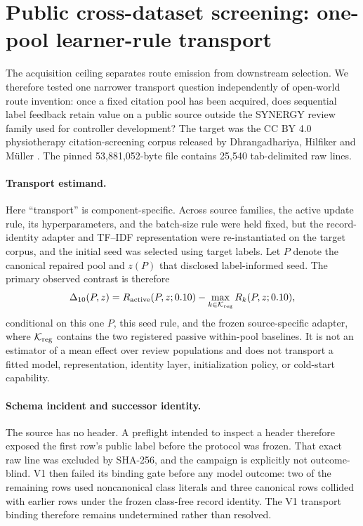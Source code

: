 \section{Public cross-dataset screening: one-pool learner-rule transport}
\label{sec:public-screening-transport}

The acquisition ceiling separates route emission from downstream selection.
We therefore tested one narrower transport question independently of open-world
route invention: once a fixed citation pool has been acquired, does sequential
label feedback retain value on a public source outside the SYNERGY review
family used for controller development?  The target was the CC BY 4.0
physiotherapy citation-screening corpus released by Dhrangadhariya, Hilfiker and
M\"uller \cite{dhrangadhariya2023citationdataset}.  The pinned 53,881,052-byte
file contains 25,540 tab-delimited raw lines.

\paragraph{Transport estimand.}
Here ``transport'' is component-specific. Across source families, the active
update rule, its hyperparameters, and the batch-size rule were held fixed, but the record-identity
adapter and TF--IDF representation were re-instantiated on the target corpus,
and the initial seed was selected using target labels. Let $P$ denote the
canonical repaired pool and $z(P)$ that disclosed label-informed seed. The
primary observed contrast is therefore
\[
 \Delta_{10}(P,z)=
 R_{\rm active}(P,z;0.10)-
 \max_{k\in\mathcal K_{\rm reg}}R_k(P,z;0.10),
\]
conditional on this one $P$, this seed rule, and the frozen source-specific
adapter, where $\mathcal K_{\rm reg}$ contains the two registered passive
within-pool baselines. It is not an estimator of a mean effect over review populations and
does not transport a fitted model, representation, identity layer,
initialization policy, or cold-start capability.

\paragraph{Schema incident and successor identity.}
The source has no header.  A preflight intended to inspect a header therefore
exposed the first row's public label before the protocol was frozen.  That exact
raw line was excluded by SHA-256, and the campaign is explicitly not
outcome-blind.  V1 then failed its binding gate before any model outcome: two of
the remaining rows used noncanonical class literals and three canonical rows
collided with earlier rows under the frozen class-free record identity.  The V1 transport binding therefore remains undetermined rather than resolved.

